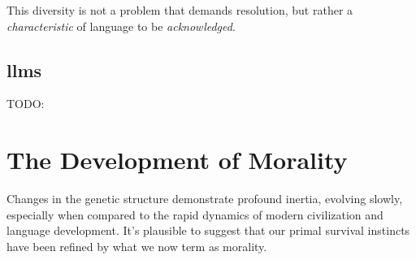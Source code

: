 \documentclass[12pt,a4]{article}
\begin{document}
        \par
        This diversity is not a problem that demands resolution, but rather a \textit{characteristic} of language to be \textit{acknowledged}.

    
    \subsection{ \ac{llms}}
    TODO:

\section{The Development of Morality}

Changes in the genetic structure demonstrate profound inertia, evolving slowly, especially when compared to the rapid dynamics of modern civilization and language development. It's plausible to suggest that our primal survival instincts have been refined by what we now term as morality.
\end{document}
